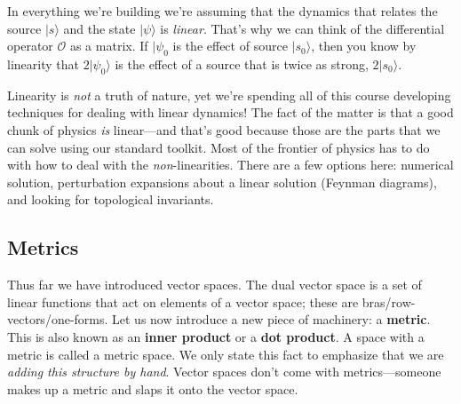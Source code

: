 In everything we're building we're assuming that the dynamics that relates  the source $|s\rangle$ and the state $|\psi\rangle$ is \emph{linear}. That's why we can think of the differential operator $\mathcal O$ as a matrix. If $|\psi_0$ is the effect of source $|s_0\rangle$, then you know by linearity that $2|\psi_0\rangle$ is the effect of a source that is twice as strong, $2|s_0\rangle$. 

Linearity is \emph{not} a truth of nature, yet we're spending all of this course developing techniques for dealing with linear dynamics! The fact of the matter is that a good chunk of physics \emph{is} linear---and that's good because those are the parts that we can solve using our standard toolkit. Most of the frontier of physics has to do with how to deal with the \emph{non}-linearities. There are a few options here: numerical solution, perturbation expansions about a linear solution (Feynman diagrams), and looking for topological invariants. 





\subsection{Metrics}

Thus far we have introduced vector spaces. The dual vector space is a set of linear functions that act on elements of a vector space; these are bras/row-vectors/one-forms. Let us now introduce a new piece of machinery: a \textbf{metric}. This is also known as an \textbf{inner product} or a \textbf{dot product}. A space with a metric is called a metric space. We only state this fact to emphasize that we are \emph{adding this structure by hand}. Vector spaces don't come with metrics---someone makes up a metric and slaps it onto the vector space.

